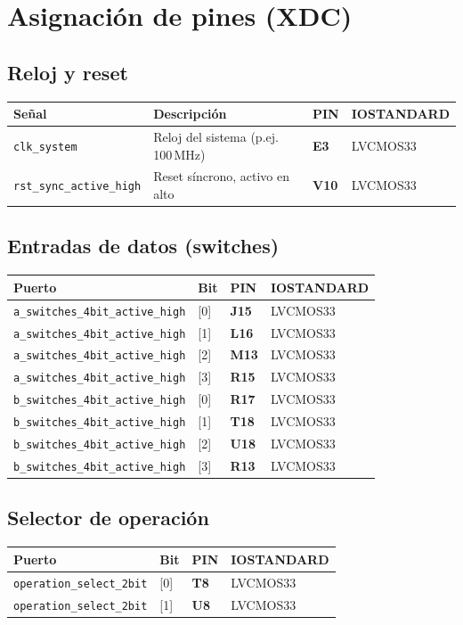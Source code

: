 \documentclass[a4paper,12pt]{article}
\begin{document}
\section{Asignación de pines (XDC)}
\label{sec:pines}

\subsection*{Reloj y reset}
\begin{tabular}{@{}llll@{}}
\toprule
\textbf{Señal} & \textbf{Descripción} & \textbf{PIN} & \textbf{IOSTANDARD} \\
\midrule
\texttt{clk\_system} & Reloj del sistema (p.ej. 100\,MHz) & \textbf{E3}  & LVCMOS33 \\
\texttt{rst\_sync\_active\_high} & Reset síncrono, activo en alto & \textbf{V10} & LVCMOS33 \\
\bottomrule
\end{tabular}

\subsection*{Entradas de datos (switches)}
\begin{tabular}{@{}llll@{}}
\toprule
\textbf{Puerto} & \textbf{Bit} & \textbf{PIN} & \textbf{IOSTANDARD} \\
\midrule
\texttt{a\_switches\_4bit\_active\_high} & [0] & \textbf{J15} & LVCMOS33 \\
\texttt{a\_switches\_4bit\_active\_high} & [1] & \textbf{L16} & LVCMOS33 \\
\texttt{a\_switches\_4bit\_active\_high} & [2] & \textbf{M13} & LVCMOS33 \\
\texttt{a\_switches\_4bit\_active\_high} & [3] & \textbf{R15} & LVCMOS33 \\
\midrule
\texttt{b\_switches\_4bit\_active\_high} & [0] & \textbf{R17} & LVCMOS33 \\
\texttt{b\_switches\_4bit\_active\_high} & [1] & \textbf{T18} & LVCMOS33 \\
\texttt{b\_switches\_4bit\_active\_high} & [2] & \textbf{U18} & LVCMOS33 \\
\texttt{b\_switches\_4bit\_active\_high} & [3] & \textbf{R13} & LVCMOS33 \\
\bottomrule
\end{tabular}

\subsection*{Selector de operación}
\begin{tabular}{@{}llll@{}}
\toprule
\textbf{Puerto} & \textbf{Bit} & \textbf{PIN} & \textbf{IOSTANDARD} \\
\midrule
\texttt{operation\_select\_2bit} & [0] & \textbf{T8} & LVCMOS33 \\
\texttt{operation\_select\_2bit} & [1] & \textbf{U8} & LVCMOS33 \\
\bottomrule
\end{tabular}
\end{document}
